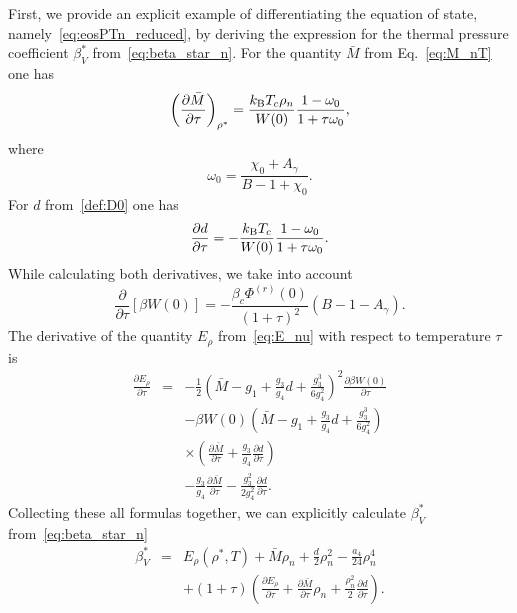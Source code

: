 \documentclass[fleqn,twoside,twocolumn,nofootinbib,showkeys]{revtex4} %
\begin{document}
	First, we provide an explicit example of differentiating the equation of state, namely~\eqref{eq:eosPTn_reduced}, by deriving the expression for the thermal pressure coefficient $\beta^*_V$ from~\eqref{eq:beta_star_n}.
	For the quantity $\bar{M}$ from Eq.~\eqref{eq:M_nT} one has
	\begin{equation}
		\left( \frac{\partial \bar{M}}{\partial \tau} \right)_{\rho^*} =
		\frac{k_{\rm B}T_c \rho_n}{W(0)} \frac{1 - \omega_0}{1 + \tau\omega_0},
	\end{equation}
	where
	\begin{equation*}
		\omega_0 = \frac{\chi_0 + A_{\gamma}}{B - 1 + \chi_0}.
	\end{equation*}
	For $d$ from~\eqref{def:D0} one has
	\begin{equation}
		\frac{\partial d}{\partial \tau} = -\frac{k_{\rm B}T_c}{W(0)} \frac{1 - \omega_0}{1 + \tau \omega_0}.
	\end{equation}
	While calculating both derivatives, we take into account
	\begin{equation}
		\frac{\partial}{\partial \tau} \left[\beta W(0)\right] = -\frac{\beta_c \Phi^{(r)}(0)}{(1+\tau)^2} (B - 1 - A_{\gamma}).
	\end{equation}
	The derivative of the quantity $E_\rho$ from~\eqref{eq:E_nu} with respect to temperature $\tau$ is
	\begin{eqnarray}
		\frac{\partial E_\rho}{\partial \tau} & = &  -\frac{1}{2}\left(\bar{M} - g_1 + \frac{g_3}{g_4} d + \frac{g_3^3}{6g_4^2} \right)^{2} 
		\frac{\partial \beta W(0)}{\partial \tau} 
		\nonumber\\
		&&-\beta W(0)\left(\bar{M} - g_1 + \frac{g_3}{g_4} d + \frac{g_3^3}{6g_4^2} \right)
		\nonumber\\
		&& \times \left(\frac{\partial \bar{M}}{\partial \tau} + \frac{g_3}{g_4}\frac{\partial d}{\partial \tau}\right)
		\nonumber\\
		&& -\frac{g_3}{g_4}\frac{\partial \bar{M}}{\partial \tau} 
		- \frac{g_3^2}{2g_4^2}\frac{\partial d}{\partial \tau}.
	\end{eqnarray}
	Collecting these all formulas together, we can explicitly calculate $\beta^*_V$ from~\eqref{eq:beta_star_n}
	\begin{eqnarray}
		\beta^*_V & = & E_\rho (\rho^*,T) + \bar{M} \rho_{n} + \frac{d}{2} \rho_{n}^2 - \frac{a_4}{24} \rho_{n}^4
		\nonumber\\
		&& + (1+\tau) \left(\frac{\partial E_{\rho}}{\partial \tau} + \frac{\partial \bar{M}}{\partial \tau}\rho_{n} + \frac{\rho_n^2}{2}\frac{\partial d}{\partial \tau}\right).
	\end{eqnarray}
\end{document}
